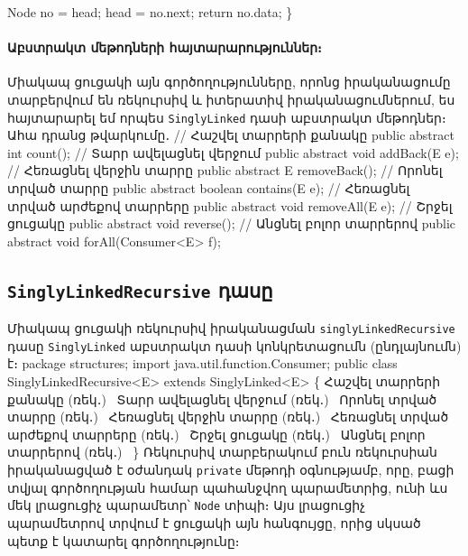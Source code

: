     Node no = head;
    head = no.next;
    return no.data;
\}
\nwendcode{}\nwdocspar


%
%
\paragraph{Աբստրակտ մեթոդների հայտարարություններ։}
Միակապ ցուցակի այն գործողությունները, որոնց իրականացումը տարբերվում 
են ռեկուրսիվ և իտերատիվ իրականացումներում, ես հայտարարել եմ որպես
\texttt{SinglyLinked} դասի աբստրակտ մեթոդներ։ Ահա դրանց թվարկումը․
\nwenddocs{}\endmoddef{}
// Հաշվել տարրերի քանակը
public abstract int count();
// Տարր ավելացնել վերջում
public abstract void addBack(E e);
// Հեռացնել վերջին տարրը
public abstract E removeBack();
// Որոնել տրված տարրը
public abstract boolean contains(E e);
// Հեռացնել տրված արժեքով տարրերը
public abstract void removeAll(E e);
// Շրջել ցուցակը
public abstract void reverse();
// Անցնել բոլոր տարրերով
public abstract void forAll(Consumer<E> f);
\nwendcode{}\nwdocspar


%
%
\subsection{\texttt{SinglyLinkedRecursive} դասը}

Միակապ ցուցակի ռեկուրսիվ իրականացման \texttt{singlyLinkedRecursive} 
դասը \texttt{SinglyLinked} աբստրակտ դասի կոնկրետացումն (ընդլայնումն)
է։ 
\nwenddocs{}\endmoddef{}
package structures;
import java.util.function.Consumer;
public class SinglyLinkedRecursive<E> extends SinglyLinked<E> \{
  \LA{}Հաշվել տարրերի քանակը (ռեկ․)~{\nwtagstyle{}}\RA{}
  \LA{}Տարր ավելացնել վերջում (ռեկ․)~{\nwtagstyle{}}\RA{}
  \LA{}Որոնել տրված տարրը (ռեկ․)~{\nwtagstyle{}}\RA{}
  \LA{}Հեռացնել վերջին տարրը (ռեկ․)~{\nwtagstyle{}}\RA{}
  \LA{}Հեռացնել տրված արժեքով տարրերը (ռեկ․)~{\nwtagstyle{}}\RA{}
  \LA{}Շրջել ցուցակը (ռեկ․)~{\nwtagstyle{}}\RA{}
  \LA{}Անցնել բոլոր տարրերով (ռեկ․)~{\nwtagstyle{}}\RA{}
\}
\nwendcode{}\nwdocspar
Ռեկուրսիվ տարբերակում բուն ռեկուրսիան իրականացված է օժանդակ  
\texttt{private} մեթոդի օգնությամբ, որը, բացի տվյալ գործողության 
համար պահանջվող պարամետրից, ունի ևս մեկ լրացուցիչ պարամետր՝ 
\texttt{Node} տիպի։ Այս լրացուցիչ պարամետրով տրվում է ցուցակի 
այն հանգույցը, որից սկսած պետք է կատարել գործողությունը։ 


